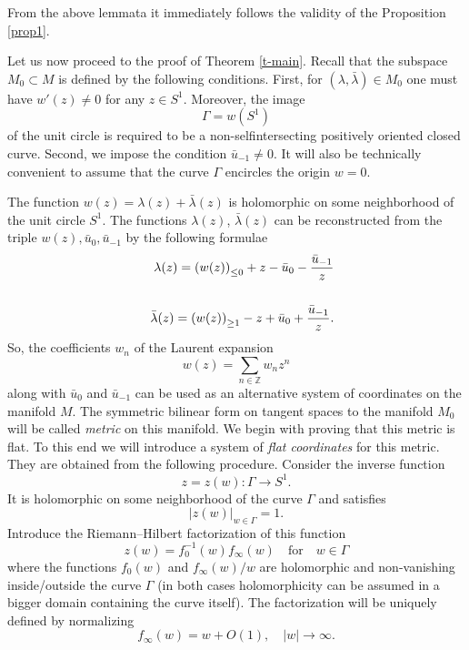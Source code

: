 \documentclass[numbook, envcountsame, envcountreset]{svjour3}
\begin{document}
From the above lemmata it immediately follows the validity of the Proposition \ref{prop1}.

\medskip

Let us now proceed to the proof of Theorem \ref{t-main}.
Recall that the subspace $M_0\subset M$ is defined by the following conditions. 
First, for $(\lambda, \bar\lambda)\in M_0$ one must have $w'(z)\neq 0$ for any $z\in S^1$. Moreover, the image
$$
\Gamma=w(S^1)
$$
of the unit circle is required to be a non-selfintersecting positively oriented closed curve. Second, we impose the condition $\bar u_{-1}\neq 0$. It will also be technically  convenient to assume that the curve $\Gamma$ encircles the origin $w=0$.

The function $w(z)=\lambda(z)+\bar\lambda(z)$ is holomorphic on some neighborhood of the unit circle $S^1$. The functions $\lambda(z)$, $\bar\lambda(z)$ can be reconstructed from the triple $w(z), \bar u_0, \bar u_{-1}$ by the following formulae
\begin{eqnarray}\label{dubl1}
&&
\lambda(z) =\left( w(z)\right)_{\leq 0} +z -\bar u_0 - \frac{\bar u_{-1}}{z}
{\nonumber}\\
&&
\\
&&
\bar\lambda(z) =\left( w(z)\right)_{\geq 1} -z +\bar u_0 + \frac{\bar u_{-1}}{z}.
{\nonumber}
\end{eqnarray}
So, the coefficients $w_n$ of the Laurent expansion
$$
w(z) =\sum_{n\in \mathbb Z} w_n z^n
$$
along with $\bar u_0$ and $\bar u_{-1}$ can be used as an alternative system of coordinates on the manifold $M$.
The symmetric bilinear form on tangent spaces to the manifold $M_0$ will be called {\it metric} on this manifold.
We begin with proving that this metric is flat. To this end we will introduce a system of {\it flat coordinates} for this metric. They are obtained from the following procedure. Consider the inverse function
$$
z=z(w): \Gamma\to S^1.
$$
It is holomorphic on some neighborhood of the curve $\Gamma$ and satisfies
$$
|z(w)|_{w\in \Gamma}=1.
$$
Introduce the Riemann--Hilbert factorization of this function
\begin{equation}\label{rh}
z(w) = f_0^{-1}(w) f_\infty(w)\quad \mbox{for}\quad w\in \Gamma
\end{equation}
where the functions $f_0(w)$ and $f_\infty(w)/w$ are holomorphic and non-vanishing inside/outside the curve $\Gamma$ (in both cases holomorphicity can be assumed in a bigger domain containing the curve itself). The factorization will be uniquely defined by normalizing
$$
f_\infty(w) = w +O(1), \quad |w|\to\infty.
$$
\end{document}
